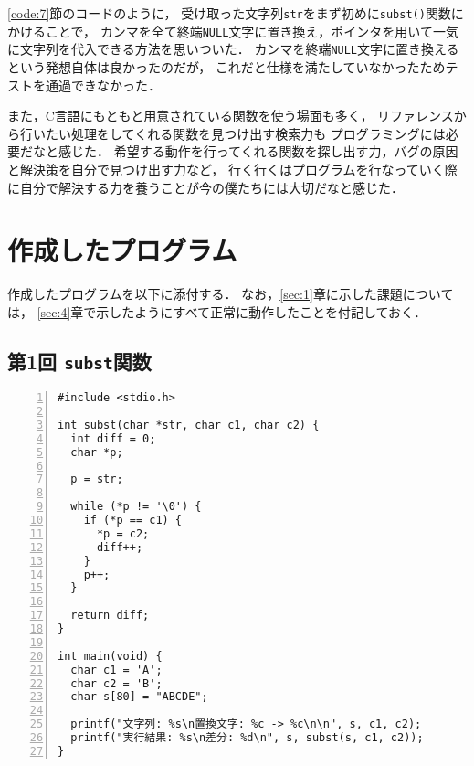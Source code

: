 \documentclass[autodetect-engine,dvi=dvipdfmx,ja=standard,
               a4j,11pt]{bxjsarticle}
\begin{document}
\ref{code:7}節のコードのように，
受け取った文字列\verb|str|をまず初めに\verb|subst()|関数にかけることで，
カンマを全て終端\verb|NULL|文字に置き換え，ポインタを用いて一気に文字列を代入できる方法を思いついた．
カンマを終端\verb|NULL|文字に置き換えるという発想自体は良かったのだが，
これだと仕様を満たしていなかったためテストを通過できなかった．

また，C言語にもともと用意されている関数を使う場面も多く，
リファレンスから行いたい処理をしてくれる関数を見つけ出す検索力も
プログラミングには必要だなと感じた．
希望する動作を行ってくれる関数を探し出す力，バグの原因と解決策を自分で見つけ出す力など，
行く行くはプログラムを行なっていく際に自分で解決する力を養うことが今の僕たちには大切だなと感じた．


\section{作成したプログラム} \label{sec:7}

作成したプログラムを以下に添付する．
なお，\ref{sec:1}章に示した課題については，
\ref{sec:4}章で示したようにすべて正常に動作したことを付記しておく．

\subsection{第1回 \texttt{subst}関数} \label{code:1}

\begin{Verbatim}[numbers=left, xleftmargin=10mm, numbersep=6pt,
    fontsize=\small, baselinestretch=0.8]
#include <stdio.h>

int subst(char *str, char c1, char c2) {
  int diff = 0;
  char *p;

  p = str;

  while (*p != '\0') {
    if (*p == c1) {
      *p = c2;
      diff++;
    }
    p++;
  }

  return diff;
}

int main(void) {
  char c1 = 'A';
  char c2 = 'B';
  char s[80] = "ABCDE";

  printf("文字列: %s\n置換文字: %c -> %c\n\n", s, c1, c2);
  printf("実行結果: %s\n差分: %d\n", s, subst(s, c1, c2));
}

\end{Verbatim}
\end{document}
